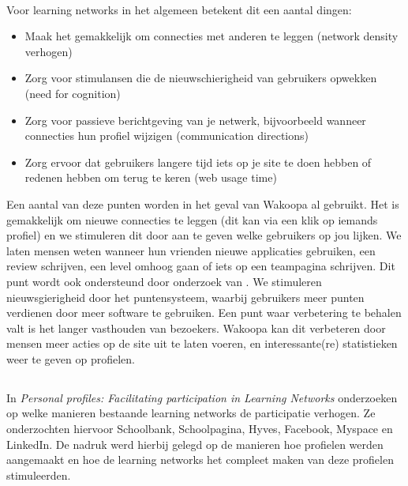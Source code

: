 \documentclass[a4paper, 10pt, pdftex]{report}
\begin{document}
        \paragraph{}
        Voor learning networks in het algemeen betekent dit een aantal dingen:
        \begin{itemize}
          \item Maak het gemakkelijk om connecties met anderen te leggen (network density verhogen)
          \item Zorg voor stimulansen die de nieuwschierigheid van gebruikers opwekken (need for cognition)
          \item Zorg voor passieve berichtgeving van je netwerk, bijvoorbeeld wanneer connecties hun profiel wijzigen (communication directions)
          \item Zorg ervoor dat gebruikers langere tijd iets op je site te doen hebben of redenen hebben om terug te keren (web usage time)
        \end{itemize}
        Een aantal van deze punten worden in het geval van Wakoopa al gebruikt. Het is gemakkelijk om nieuwe connecties te leggen (dit kan via een klik op iemands profiel) en we stimuleren dit door aan te geven welke gebruikers op jou lijken. We laten mensen weten wanneer hun vrienden nieuwe applicaties gebruiken, een review schrijven, een level omhoog gaan of iets op een teampagina schrijven. Dit punt wordt ook ondersteund door onderzoek van \cite{Berlanga2007}. We stimuleren nieuwsgierigheid door het puntensysteem, waarbij gebruikers meer punten verdienen door meer software te gebruiken. Een punt waar verbetering te behalen valt is het langer vasthouden van bezoekers. Wakoopa kan dit verbeteren door mensen meer acties op de site uit te laten voeren, en interessante(re) statistieken weer te geven op profielen.

    \subsection{\cite{Brouns2008}}

    In \emph{Personal profiles: Facilitating participation in Learning Networks} onderzoeken \citeauthor{Brouns2008} op welke manieren bestaande learning networks de participatie verhogen. Ze onderzochten hiervoor Schoolbank, Schoolpagina, Hyves, Facebook, Myspace en LinkedIn. De nadruk werd hierbij gelegd op de manieren hoe profielen werden aangemaakt en hoe de learning networks het compleet maken van deze profielen stimuleerden.
\end{document}
